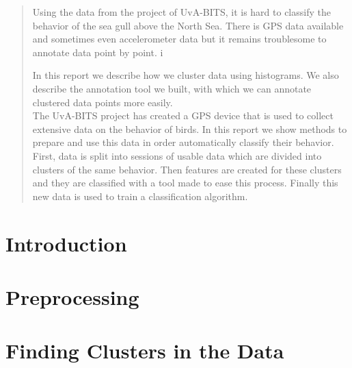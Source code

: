 \documentclass[a4paper, 11pt]{article}
\begin{document}

\vspace*{00mm}
\tableofcontents
\newpage



\newcommand{\minimumSessionLengthMinutes}{60\xspace}
\newcommand{\resolutionRange}{$0.2$ - $\infty$\xspace}
\newcommand{\sessionSeparatorLengthMinutes}{15\xspace}
\newcommand{\timeThreshold}{1200\xspace}
\newcommand{\windowSize}{20 minutes\xspace}

\begin{abstract}
Using the data from the project of UvA-BITS, it is hard to classify the behavior of the sea gull above the North Sea. 
There is GPS data available and sometimes even accelerometer data but it 
remains troublesome to annotate data point by point. i

In this report we 
describe how we cluster data using histograms. We also describe the annotation
tool we built, with which we can annotate clustered data points more easily. \\


The UvA-BITS project has created a GPS device that is used to collect extensive data on the behavior of birds. In this report we show methods to prepare and use this data in order automatically classify their behavior. First, data is split into sessions of usable data which are divided into clusters of the same behavior. Then features are created for these clusters and they are classified with a tool made to ease this process. Finally this new data is used to train a classification algorithm.
\end{abstract}

\section{Introduction}



\section{Preprocessing}



 
\section{Finding Clusters in the Data}

\end{document}
